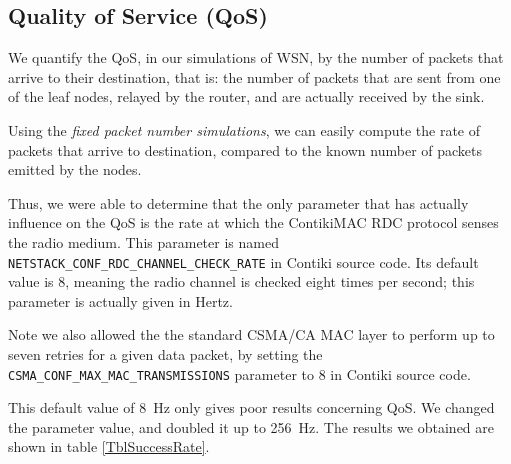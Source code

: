 \documentclass[a4paper,twoside]{article}
\begin{document}
\subsection{Quality of Service (QoS)}

We quantify the QoS, in our simulations of WSN, by the number of packets
that arrive to their destination, that is: the number of packets that are
sent from one of the leaf nodes, relayed by the router, and are actually
received by the sink.

Using the \emph{fixed packet number simulations}, we can easily compute the
rate of packets that arrive to destination, compared to the known number
of packets emitted by the nodes.

Thus, we were able to determine that the only parameter that has actually
influence on the QoS is the rate at which the ContikiMAC RDC protocol
senses the radio medium. This parameter is named
\texttt{NETSTACK\_CONF\_RDC\_CHANNEL\_CHECK\_RATE} in Contiki source code.
Its default value is 8, meaning the radio channel is checked eight times
per second; this parameter is actually given in Hertz.

Note we also allowed the the standard CSMA/CA MAC layer to perform up to
seven retries for a given data packet, by setting the
\texttt{CSMA\_CONF\_MAX\_MAC\_TRANSMISSIONS}
parameter to 8 in Contiki source code.

This default value of 8~Hz only gives poor results concerning QoS.
We changed the parameter value, and doubled it up to 256~Hz. The results
we obtained are shown in table \ref{TblSuccessRate}.
\end{document}
